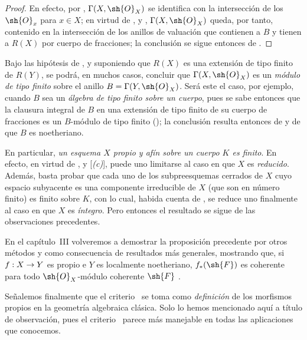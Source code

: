 \documentclass[oneside,10pt]{amsart}
\makeatletter
\newcommand{\ega@arrow}[2]{\mathchoice{#1}{#2}{#2}{#2}}
\renewcommand{\to}{\ega@arrow{\longrightarrow}{\rightarrow}}
\let\EGAOriginalLabel\label
\renewcommand{\label}[1]{\phantomsection\EGAOriginalLabel{#1}}
\makeatother
\begin{document}
\begin{proof}
En efecto, por , $\Gamma(X,\sh{O}_X)$ se identifica con la intersección de los $\sh{O}_x$ para $x\in X$;
en virtud de ,  y , $\Gamma(X,\sh{O}_X)$ queda, por tanto, contenido en la intersección de los anillos de valuación que contienen a $B$ y tienen a $R(X)$ por cuerpo de fracciones;
la conclusión se sigue entonces de .
\end{proof}

\begin{remarks}[7.3.12]
\label{II.7.3.12}
Bajo las hipótesis de , y suponiendo que $R(X)$ es una extensión de tipo finito de $R(Y)$, se podrá, en muchos casos, concluir que $\Gamma(X,\sh{O}_X)$ es un \emph{módulo de tipo finito} sobre el anillo $B=\Gamma(Y,\sh{O}_X)$.
Será este el caso, por ejemplo, cuando $B$ sea un \emph{álgebra de tipo finito sobre un cuerpo}, pues se sabe entonces que la clausura integral de $B$ en una extensión de tipo finito de su cuerpo de fracciones es un $B$-módulo de tipo finito (\cite[t.~I, p.~267, th.~9]{I-13});
la conclusión resulta entonces de  y de que $B$ es noetheriano.

En particular, \emph{un esquema $X$ propio y afín sobre un cuerpo $K$ es finito}.
En efecto, en virtud de ,  y [\emph{(c)}], puede uno limitarse al caso en que $X$ es \emph{reducido}.
Además, basta probar que cada uno de los subpreesquemas cerrados de $X$ cuyo espacio subyacente es una componente irreducible de $X$ (que son en número finito) es finito sobre $K$, con lo cual, habida cuenta de , se reduce uno finalmente al caso en que $X$ es \emph{íntegro}.
Pero entonces el resultado se sigue de las observaciones precedentes.

En el capítulo~III volveremos a demostrar la proposición precedente por otros métodos y como consecuencia de resultados más generales, mostrando que, si $f:X\to Y$ es propio e $Y$ es localmente noetheriano, $f_*(\sh{F})$ es coherente para todo $\sh{O}_X$-módulo coherente $\sh{F}$ .

Señalemos finalmente que el criterio~ se toma como \emph{definición} de los morfismos propios en la geometría algebraica clásica.
Solo lo hemos mencionado aquí a título de observación, pues el criterio~ parece más manejable en todas las aplicaciones que conocemos.
\end{remarks}
\end{document}
